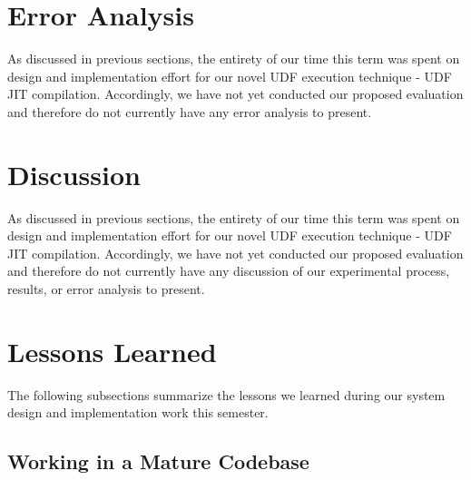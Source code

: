 \documentclass{vldb}
\begin{document}

\section{Error Analysis}

As discussed in previous sections, the entirety of our time this term was spent on design and implementation effort for our novel UDF execution technique - UDF JIT compilation. Accordingly, we have not yet conducted our proposed evaluation and therefore do not currently have any error analysis to present.


\section{Discussion}

As discussed in previous sections, the entirety of our time this term was spent on design and implementation effort for our novel UDF execution technique - UDF JIT compilation. Accordingly, we have not yet conducted our proposed evaluation and therefore do not currently have any discussion of our experimental process, results, or error analysis to present.


\section{Lessons Learned}

The following subsections summarize the lessons we learned during our system design and implementation work this semester.

\subsection{Working in a Mature Codebase}
\end{document}
